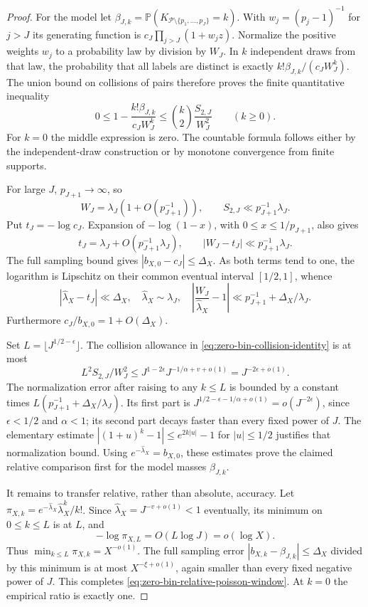 \documentclass[11pt]{article}
\theoremstyle{definition}
\begin{document}
\begin{proof}
For the model let $\beta_{J,k}=\mathbb P(K_{\mathcal P\setminus
\{p_1,\ldots,p_J\}}=k)$.
With $w_j=(p_j-1)^{-1}$ for $j>J$ its generating function is
$c_J\prod_{j>J}(1+w_jz)$.
Normalize the positive weights $w_j$ to a probability law by
division by $W_J$.
In $k$ independent draws from that law, the probability that
all labels are distinct is exactly
$k!\beta_{J,k}/(c_JW_J^k)$.
The union bound on collisions of pairs therefore proves the
finite quantitative inequality
\begin{equation}
 0\le1-\frac{k!\beta_{J,k}}{c_JW_J^k}
       \le {k\choose2}\frac{S_{2,J}}{W_J^2}
                           \qquad(k\ge0).
 \label{eq:zero-bin-collision-identity}
\end{equation}
For $k=0$ the middle expression is zero.
The countable formula follows either by the independent-draw
construction or by monotone convergence from finite supports.

For large $J$, $p_{J+1}\to\infty$, so
\[
 W_J=\lambda_J(1+O(p_{J+1}^{-1})),\qquad
 S_{2,J}\ll p_{J+1}^{-1}\lambda_J .
\]
Put $t_J=-\log c_J$.
Expansion of $-\log(1-x)$, with $0\le x\le1/p_{J+1}$,
also gives
\[
 t_J=\lambda_J+O(p_{J+1}^{-1}\lambda_J),\qquad
 |W_J-t_J|\ll p_{J+1}^{-1}\lambda_J .
\]
The full sampling bound gives
$|b_{X,0}-c_J|\le\Delta_X$.
As both terms tend to one, the logarithm is Lipschitz on
their common eventual interval $[1/2,1]$, whence
\[
 |\widehat\lambda_X-t_J|\ll\Delta_X,\quad
 \widehat\lambda_X\sim\lambda_J,\quad
 \left|\frac{W_J}{\widehat\lambda_X}-1\right|
       \ll p_{J+1}^{-1}+\Delta_X/\lambda_J .
\]
Furthermore $c_J/b_{X,0}=1+O(\Delta_X)$.

Set $L=\lfloor J^{1/2-\epsilon}\rfloor$.
The collision allowance in \eqref{eq:zero-bin-collision-identity}
is at most
\[
 L^2S_{2,J}/W_J^2
       \le J^{1-2\epsilon}
              J^{-1/\alpha+v+o(1)}
       =J^{-2\epsilon+o(1)}.
\]
The normalization error after raising to any $k\le L$ is
bounded by a constant times
$L(p_{J+1}^{-1}+\Delta_X/\lambda_J)$.
Its first part is
$J^{1/2-\epsilon-1/\alpha+o(1)}
=o(J^{-2\epsilon})$, since $\epsilon<1/2$ and $\alpha<1$;
its second part decays faster than every fixed power of $J$.
The elementary estimate
$|(1+u)^k-1|\le e^{2k|u|}-1$ for $|u|\le1/2$
justifies that normalization bound.
Using $e^{-\widehat\lambda_X}=b_{X,0}$,
these estimates prove the claimed relative comparison first
for the model masses $\beta_{J,k}$.

It remains to transfer relative, rather than absolute, accuracy.
Let
$\pi_{X,k}=e^{-\widehat\lambda_X}
\widehat\lambda_X^k/k!$.
Since $\widehat\lambda_X=J^{-v+o(1)}<1$ eventually,
its minimum on $0\le k\le L$ is at $L$, and
\[
 -\log\pi_{X,L}=O(L\log J)=o(\log X).
\]
Thus $\min_{k\le L}\pi_{X,k}=X^{-o(1)}$.
The full sampling error $|b_{X,k}-\beta_{J,k}|\le\Delta_X$
divided by this minimum is at most $X^{-\xi+o(1)}$,
again smaller than every fixed negative power of $J$.
This completes \eqref{eq:zero-bin-relative-poisson-window}.
At $k=0$ the empirical ratio is exactly one.
\end{proof}
\end{document}
